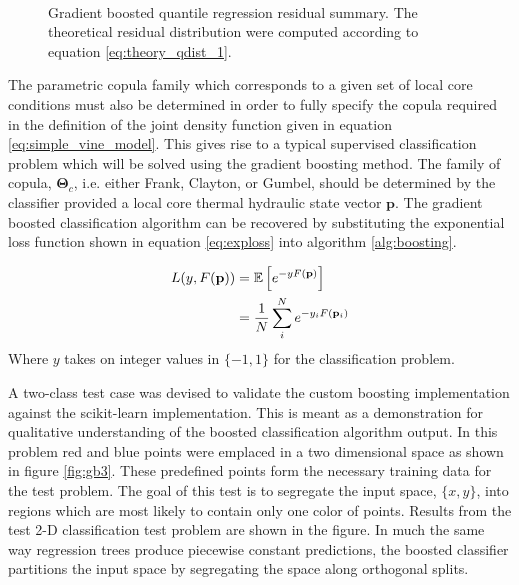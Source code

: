 \begin{figure}[H]%
    \centering
    \hspace*{-1.0em}%
    \hspace*{-1.0em}%
    \\
    \hspace*{-1.0em}%
    \hspace*{-1.0em}%
    \caption[Gradient boosted quantile regression residual summary.]{Gradient boosted quantile regression residual summary.  The theoretical residual distribution were computed according to equation \ref{eq:theory_qdist_1}.} %
    \label{fig:gb2}%
\end{figure}

The parametric copula family which corresponds to a given set of local core conditions must also be determined in order to fully specify the copula required in the definition of the joint density function given in equation \ref{eq:simple_vine_model}.   This gives rise to a typical supervised classification problem which will be solved using the gradient boosting method.  The family of copula, $\mathbf \Theta_c$, i.e. either Frank, Clayton, or Gumbel, should be determined by the classifier provided a local core thermal hydraulic state vector $\mathbf p$.   The gradient boosted classification algorithm can be recovered by substituting the exponential loss function shown in equation \ref{eq:exploss} into algorithm \ref{alg:boosting}.   

\begin{align}
L(y, F(\mathbf p)) &= \operatorname*{\mathbb{E}} \left[ e^{-yF(\mathbf p)}\right] \nonumber \\
 &= \frac{1}{N}\sum_i^N e^{-y_iF(\mathbf p_i)}
\label{eq:exploss}
\end{align}
Where $y$ takes on integer values in $\{-1, 1\}$ for the classification problem.

A two-class test case was devised to validate the custom boosting implementation against the scikit-learn implementation.   This is meant as a demonstration for qualitative understanding of the boosted classification algorithm output.  In this problem red and blue points were emplaced in a two dimensional space as shown in figure \ref{fig:gb3}.  These predefined points form the necessary training data for the test problem. The goal of this test is to segregate the input space, $\{x, y\}$, into regions which are most likely to contain only one color of points. Results from the test 2-D classification test problem are shown in the figure.   In much the same way regression trees produce piecewise constant predictions, the boosted classifier partitions the input space by segregating the space along orthogonal splits.  

